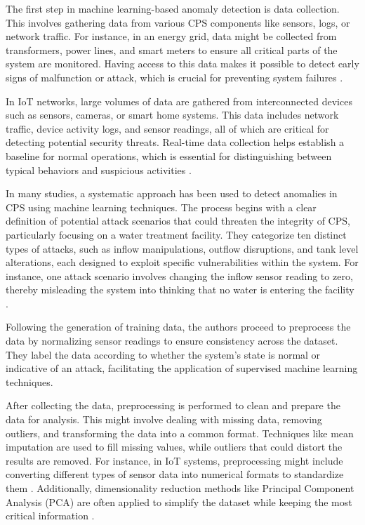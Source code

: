 The first step in machine learning-based anomaly detection is data collection. This involves gathering data from various CPS components like sensors, logs, or network traffic. For instance, in an energy grid, data might be collected from transformers, power lines, and smart meters to ensure all critical parts of the system are monitored. Having access to this data makes it possible to detect early signs of malfunction or attack, which is crucial for preventing system failures \cite{44}.

In IoT networks, large volumes of data are gathered from interconnected devices such as sensors, cameras, or smart home systems. This data includes network traffic, device activity logs, and sensor readings, all of which are critical for detecting potential security threats. Real-time data collection helps establish a baseline for normal operations, which is essential for distinguishing between typical behaviors and suspicious activities \cite{84}.

In many studies, a systematic approach has been used to detect anomalies in CPS using machine learning techniques. The process begins with a clear definition of potential attack scenarios that could threaten the integrity of CPS, particularly focusing on a water treatment facility. They categorize ten distinct types of attacks, such as inflow manipulations, outflow disruptions, and tank level alterations, each designed to exploit specific vulnerabilities within the system. For instance, one attack scenario involves changing the inflow sensor reading to zero, thereby misleading the system into thinking that no water is entering the facility \cite{92}.

Following the generation of training data, the authors proceed to preprocess the data by normalizing sensor readings to ensure consistency across the dataset. They label the data according to whether the system's state is normal or indicative of an attack, facilitating the application of supervised machine learning techniques.

After collecting the data, preprocessing is performed to clean and prepare the data for analysis. This might involve dealing with missing data, removing outliers, and transforming the data into a common format. Techniques like mean imputation are used to fill missing values, while outliers that could distort the results are removed. For instance, in IoT systems, preprocessing might include converting different types of sensor data into numerical formats to standardize them \cite{84, 85}. Additionally, dimensionality reduction methods like Principal Component Analysis (PCA) are often applied to simplify the dataset while keeping the most critical information \cite{44}.

